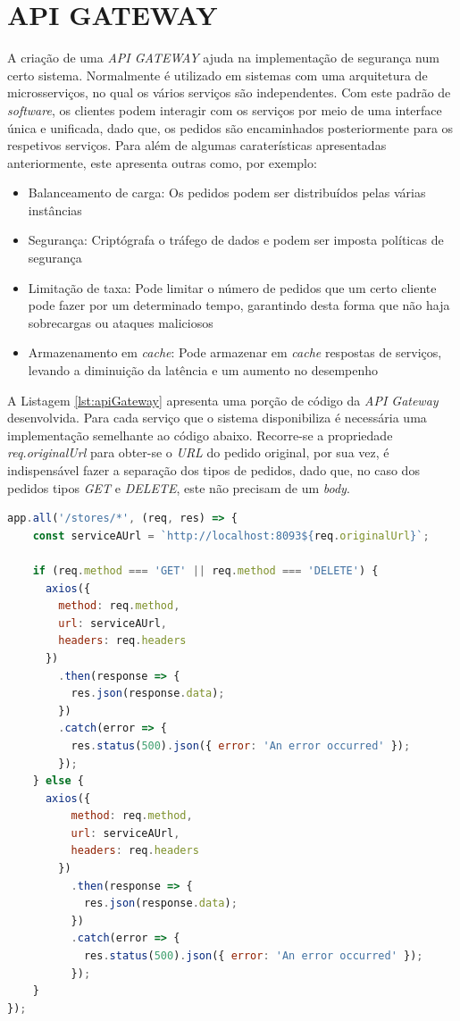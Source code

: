 \section{API GATEWAY}

A criação de uma \textit{API GATEWAY} ajuda na implementação de segurança num certo sistema. Normalmente é utilizado em sistemas com uma arquitetura de microsserviços, no qual os vários serviços são independentes. Com este padrão de \textit{software}, os clientes podem interagir com os serviços por meio de uma interface única e unificada, dado que, os pedidos são encaminhados posteriormente para os respetivos serviços. Para além de algumas caraterísticas apresentadas anteriormente, este apresenta outras como, por exemplo:

\begin{itemize}
    \item Balanceamento de carga: Os pedidos podem ser distribuídos pelas várias instâncias
    \item Segurança: Criptógrafa o tráfego de dados e podem ser imposta políticas de segurança
    \item Limitação de taxa: Pode limitar o número de pedidos que um certo cliente pode fazer por um determinado tempo, garantindo desta forma que não haja sobrecargas ou ataques maliciosos
    \item Armazenamento em \textit{cache}: Pode armazenar em \textit{cache} respostas de serviços, levando a diminuição da latência e um aumento no desempenho
\end{itemize}

A Listagem \ref{lst:apiGateway} apresenta uma porção de código da \textit{API Gateway} desenvolvida. Para cada serviço que o sistema disponibiliza é necessária uma implementação semelhante ao código abaixo. Recorre-se a propriedade \textit{req.originalUrl} para obter-se o \textit{URL} do pedido original, por sua vez, é indispensável fazer a separação dos tipos de pedidos, dado que, no caso dos pedidos tipos \textit{GET} e \textit{DELETE}, este não precisam de um \textit{body}.

\begin{minipage}{1\linewidth}
\begin{lstlisting}[language=javascript, caption=API Gateway desenvolvida., label=lst:apiGateway]
app.all('/stores/*', (req, res) => {
    const serviceAUrl = `http://localhost:8093${req.originalUrl}`;
  
    if (req.method === 'GET' || req.method === 'DELETE') {
      axios({
        method: req.method,
        url: serviceAUrl,
        headers: req.headers
      })
        .then(response => {
          res.json(response.data);
        })
        .catch(error => {
          res.status(500).json({ error: 'An error occurred' });
        });
    } else {
      axios({
          method: req.method,
          url: serviceAUrl,
          headers: req.headers
        })
          .then(response => {
            res.json(response.data);
          })
          .catch(error => {
            res.status(500).json({ error: 'An error occurred' });
          });
    }
});
\end{lstlisting}
\end{minipage}

